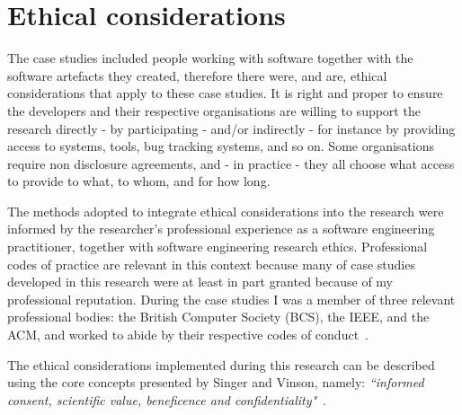 \section{Ethical considerations}
\label{methodology-ethical-considerations-section}
The case studies included people working with software together with the software artefacts they created, therefore there were, and are, ethical considerations that apply to these case studies. 
It is right and proper to ensure the developers and their respective organisations are willing to support the research directly - by participating - and/or indirectly - for instance by providing access to systems, tools, bug tracking systems, and so on. Some organisations require non disclosure agreements, and - in practice - they all choose what access to provide to what, to whom, and for how long. 


The methods adopted to integrate ethical considerations into the research were informed by the researcher's professional experience as a software engineering practitioner, together with software engineering research ethics. Professional codes of practice are relevant in this context because many of case studies developed in this research were at least in part granted because of my professional reputation. During the case studies I was  a member of three relevant professional bodies: the British Computer Society (BCS), the IEEE, and the ACM, and worked to abide by their respective codes of conduct~\citep{bcs_code_of_conduct_2021, ieee_and_acm_code_1999on}.

The ethical considerations implemented during this research can be described using the core concepts presented by Singer and Vinson, namely: \emph{``informed consent, scientific value, beneficence and confidentiality"}~\citep[p.1178]{singer2002_ethical_issues_in_empirical_studies_of_software_engineering}. 



